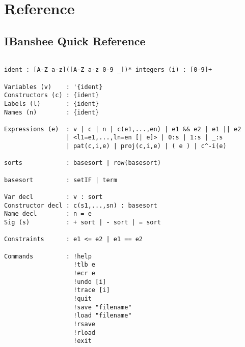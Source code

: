 \documentclass[10pt]{article}
\begin{document}
\section{Reference}
\label{sec-reference}

\begin{comment}
\subsection{Sets in Inductive Form}
\label{sec-setif}

\subsection{Sets in Sub-Transitve Form}
\label{sec-setst}

\subsection{Terms}
\label{sec-term}

\subsection{Rows}
\label{sec-rows}
\end{comment}

\subsection{IBanshee Quick Reference}
\begin{verbatim}

ident : [A-Z a-z]([A-Z a-z 0-9 _])* integers (i) : [0-9]+

Variables (v)    : '{ident}
Constructors (c) : {ident}
Labels (l)       : {ident}
Names (n)        : {ident}

Expressions (e)  : v | c | n | c(e1,...,en) | e1 && e2 | e1 || e2
                 | <l1=e1,...,ln=en [| e]> | 0:s | 1:s | _:s
                 | pat(c,i,e) | proj(c,i,e) | ( e ) | c^-i(e)

sorts            : basesort | row(basesort)

basesort         : setIF | term

Var decl         : v : sort
Constructor decl : c(s1,...,sn) : basesort
Name decl        : n = e 
Sig (s)          : + sort | - sort | = sort

Constraints      : e1 <= e2 | e1 == e2

Commands         : !help
                   !tlb e
                   !ecr e
                   !undo [i]
                   !trace [i]
                   !quit
                   !save "filename"
                   !load "filename"
                   !rsave
                   !rload
                   !exit
\end{verbatim}
\end{document}
